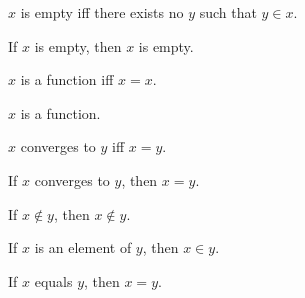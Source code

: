 \begin{abbreviation}\label{empty}
    $x$ is empty iff there exists no $y$ such that $y\in x$.
\end{abbreviation}

\begin{proposition}\label{dummy_abbr_test_adj}
   If $x$ is empty, then $x$ is empty.
\end{proposition}


\begin{abbreviation}\label{function}
    $x$ is a function iff $x = x$.
\end{abbreviation}

\begin{proposition}\label{dummy_abbr_test_noun}
    $x$ is a function.
 \end{proposition}


\begin{abbreviation}\label{converges}
    $x$ converges to $y$ iff $x = y$.
\end{abbreviation}

\begin{proposition}\label{dummy_abbr_test_verb}
    If $x$ converges to $y$, then $x = y$.
 \end{proposition}


\begin{proposition}\label{abbr_test_notin}
   If $x\notin y$, then $x\not\in y$.
\end{proposition}


\begin{proposition}\label{abbr_test_elementof_is_in}
    If $x$ is an element of $y$, then $x\in y$.
\end{proposition}


\begin{proposition}\label{abbr_test_equals_is_eq}
    If $x$ equals $y$, then $x = y$.
\end{proposition}
